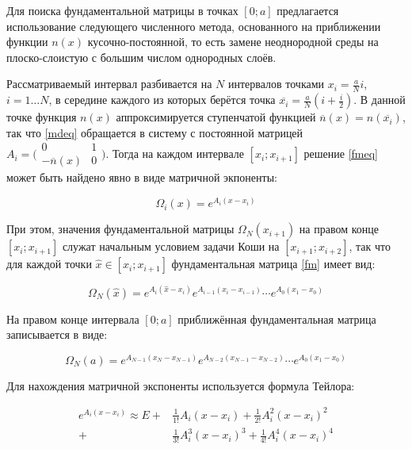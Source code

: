 \documentclass{article}
\numberwithin{equation}{section}
\begin{document}
Для поиска фундаментальной матрицы в точках $[0; a]$ предлагается
использование следующего численного метода, основанного на приближении
функции $n(x)$ кусочно-постоянной, то есть замене неоднородной среды
на плоско-слоистую с большим числом однородных слоёв.

Рассматриваемый интервал разбивается на $N$ интервалов точками
$x_i = \frac{a}{N}i$, $i = 1 \dotso N$, в середине каждого из
которых берётся точка $\overline{x_i} = \frac{a}{N}(i+\frac{i}{2})$. В
данной точке функция $n(x)$ аппроксимируется ступенчатой функцией
$\overline{n}(x) = n(\overline{x_i})$, так что \eqref{mdeq} обращается
в систему с постоянной матрицей $A_i = \bigl(
\begin{smallmatrix}0& 1 \\ -\overline{n}(x)& 0 \end{smallmatrix}
\bigr)$. Тогда на каждом интервале $[x_i; x_{i+1}]$ решение
\eqref{fmeq} может быть найдено явно в виде матричной экпоненты:

\[
\Omega_i(x) = e^{A_i (x - x_i)}
\]

При этом, значения фундаментальной матрицы $\Omega_N(x_{i+1})$ на
правом конце $[x_i; x_{i+1}]$ служат начальным условием задачи Коши на
$[x_{i+1}; x_{i+2}]$, так что для каждой точки $\hat{x} \in [x_i;
x_{i+1}]$ фундаментальная матрица \eqref{fm} имеет вид:

\begin{equation}\label{fmx}
  \Omega_N(\hat{x}) = e^{A_i(\hat{x}-x_i)} e^{A_{i-1}(x_i-x_{i-1})} \dotsm e^{A_0(x_1-x_0)}
\end{equation}

На правом конце интервала $[0; a]$ приближённая фундаментальная
матрица записывается в виде:

\begin{equation}\label{fma}
  \Omega_N(a) = e^{A_{N-1}(x_N-x_{N-1})} e^{A_{N-2}(x_{N-1}-x_{N-2})} \dotsm e^{A_0(x_1-x_0)}
\end{equation}

Для нахождения матричной экспоненты используется формула Тейлора:

\begin{equation}\label{matrix-exp}
\begin{split}
  e^{A_i(x-x_i)} \approx E +& \frac{1}{1!}{A_i(x-x_i)} +
  \frac{1}{2!}{A_i^2(x-x_i)^2}\\
  +& \frac{1}{3!}{A_i^3(x-x_i)^3} + \frac{1}{4!}{A_i^4(x-x_i)^4}
\end{split}
\end{equation}
\end{document}
